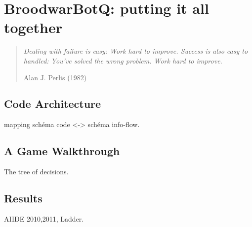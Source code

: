 \chapter{BroodwarBotQ: putting it all together}
\chaptertoc

\begin{quotation}
\textit{Dealing with failure is easy: Work hard to improve. Success is also easy to handled: You've solved the wrong problem. Work hard to improve.}\\
\begin{flushright}Alan J. Perlis (1982)\end{flushright}
\end{quotation}

\section{Code Architecture}
mapping schéma code <-> schéma info-flow.

\section{A Game Walkthrough}
The tree of decisions.

\section{Results}
AIIDE 2010,2011, Ladder.


